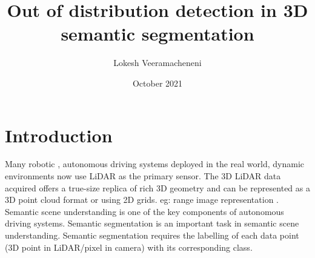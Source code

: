 \documentclass[thesis]{mas_proposal}
\title{Out of distribution detection in 3D semantic segmentation}
\author{Lokesh Veeramacheneni}
\date{October 2021}
\begin{document}
\maketitle

\pagestyle{plain}

\section{Introduction}
Many robotic \cite{thrun2006stanley} \cite{patz2008practical}, autonomous driving \cite{li2016vehicle} systems deployed in the real world, dynamic environments now use LiDAR as the primary sensor.
The 3D LiDAR data acquired offers a true-size replica of rich 3D geometry and can be represented as a 3D point cloud format or using 2D grids. eg: range image representation \cite{Milioto2019}.
Semantic scene understanding is one of the key components of autonomous driving systems. 
Semantic segmentation is an important task in semantic scene understanding.
Semantic segmentation requires the labelling of each data point (3D point in LiDAR/pixel in camera) with its corresponding class.
\end{document}

